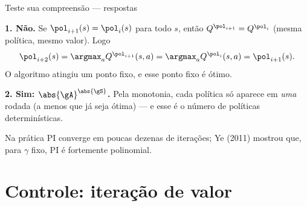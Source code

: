 \documentclass[aspectratio=169, 11pt]{beamer}
\begin{document}
\begin{frame}{Teste sua compreensão --- respostas}
  \begin{respbox}
    \textbf{1. Não.} Se $\pol_{i+1}(s) = \pol_i(s)$ para todo $s$, então
    $Q^{\pol_{i+1}} = Q^{\pol_i}$ (mesma política, mesmo valor). Logo
    \[
      \pol_{i+2}(s) = \argmax_a Q^{\pol_{i+1}}(s,a) = \argmax_a Q^{\pol_i}(s,a) = \pol_{i+1}(s).
    \]
    O algoritmo atingiu um ponto fixo, e esse ponto fixo é ótimo.
  \end{respbox}
  \begin{respbox}
    \textbf{2. Sim: $\abs{\gA}^{\abs{\gS}}$.} Pela monotonia, cada política só aparece em
    \emph{uma} rodada (a menos que já seja ótima) --- e esse é o número de políticas
    determinísticas.
  \end{respbox}
  \begin{ideiabox}
    Na prática PI converge em poucas dezenas de iterações; Ye (2011) mostrou que, para
    $\gamma$ fixo, PI é \alert{fortemente polinomial}.
  \end{ideiabox}
\end{frame}

\section{Controle: iteração de valor}
\end{document}
